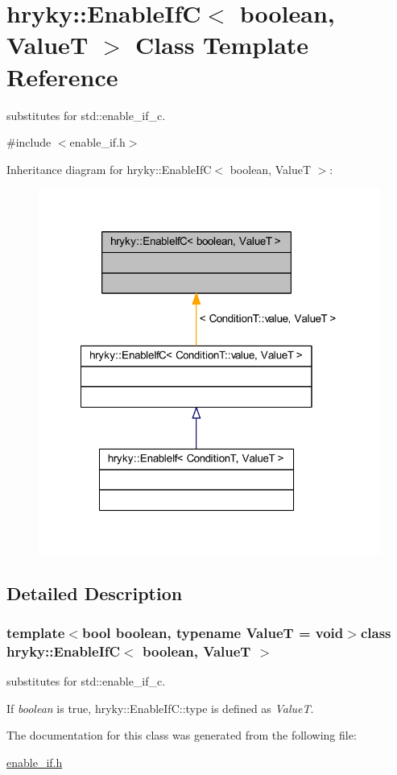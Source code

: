 \hypertarget{classhryky_1_1_enable_if_c}{\section{hryky\-:\-:Enable\-If\-C$<$ boolean, Value\-T $>$ Class Template Reference}
\label{classhryky_1_1_enable_if_c}
}


substitutes for std\-::enable\-\_\-if\-\_\-c.  




{\ttfamily \#include $<$enable\-\_\-if.\-h$>$}



Inheritance diagram for hryky\-:\-:Enable\-If\-C$<$ boolean, Value\-T $>$\-:
\nopagebreak
\begin{figure}[H]
\begin{center}
\leavevmode
\includegraphics[width=318pt]{classhryky_1_1_enable_if_c__inherit__graph}
\end{center}
\end{figure}


\subsection{Detailed Description}
\subsubsection*{template$<$bool boolean, typename Value\-T = void$>$class hryky\-::\-Enable\-If\-C$<$ boolean, Value\-T $>$}

substitutes for std\-::enable\-\_\-if\-\_\-c. 

If {\itshape boolean\/} is true, hryky\-::\-Enable\-If\-C\-::type is defined as {\itshape Value\-T\/}. 

The documentation for this class was generated from the following file\-:\begin{DoxyCompactItemize}
\item 
\hyperlink{enable__if_8h}{enable\-\_\-if.\-h}\end{DoxyCompactItemize}
